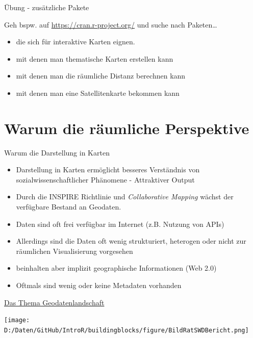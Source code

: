 \documentclass[ignorenonframetext,]{beamer}
\providecommand{\tightlist}{%
  \setlength{\itemsep}{0pt}\setlength{\parskip}{0pt}}
\begin{document}
\begin{frame}{Übung - zusätzliche Pakete}

Geh bspw. auf \url{https://cran.r-project.org/} und suche nach
Paketen\ldots{}

\begin{itemize}
\tightlist
\item
  die sich für interaktive Karten eignen.
\item
  mit denen man thematische Karten erstellen kann
\item
  mit denen man die räumliche Distanz berechnen kann
\item
  mit denen man eine Satellitenkarte bekommen kann
\end{itemize}

\end{frame}

\section{Warum die räumliche
Perspektive}\label{warum-die-raumliche-perspektive}

\begin{frame}{Warum die Darstellung in Karten}

\begin{itemize}
\item
  Darstellung in Karten ermöglicht besseres Verständnis von
  sozialwissenschaftlicher Phänomene - Attraktiver Output
\item
  Durch die INSPIRE Richtlinie und \emph{Collaborative Mapping} wächst
  der verfügbare Bestand an Geodaten.
\item
  Daten sind oft frei verfügbar im Internet (z.B. Nutzung von APIs)
\item
  Allerdings sind die Daten oft wenig strukturiert, heterogen oder nicht
  zur räumlichen Visualisierung vorgesehen
\item
  beinhalten aber implizit geographische Informationen (Web 2.0)
\item
  Oftmals sind wenig oder keine Metadaten vorhanden
\end{itemize}

\end{frame}

\begin{frame}{\href{https://www.ratswd.de/dl/downloads/RatSWD_Geodatenbericht.pdf}{Das
Thema Geodatenlandschaft}}

\texttt{[image: D:/Daten/GitHub/IntroR/buildingblocks/figure/BildRatSWDBericht.png]}

\end{frame}
\end{document}
